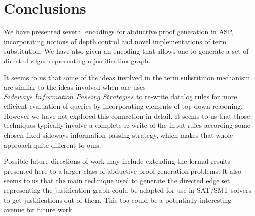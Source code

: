 \section{ Conclusions}\label{sec:conclusion}
We have presented several encodings for abductive proof generation in ASP,
incorporating notions of depth control and  novel implementations of term
substitution. We have also given an encoding that allows one to generate a set
of directed edges representing a justification graph.

It seems to us that some of the ideas involved in the term substituion
mechanism are similar to the ideas involved when one uses $\textit{Sideways
  Information Passing Strategies}$ \cite{beeri91} to re-write datalog rules
for more efficient evaluation of queries by incorporating elements of top-down
reasoning. However we have not explored this connection in detail. It seems to
us that those techniques typically involve a complete re-write of the input
rules according some chosen fixed sideways information passing strategy, which
makes that whole approach quite different to ours.

Possible future directions of work may include extending the formal results
presented here to a larger class of abductive proof generation problems. It
also seems to us that the main technique used to generate the directed edge
set representing the justification graph could be adapted for use in SAT/SMT
solvers to get justifications out of them. This too could be a potentially
interesting avenue for future work.




